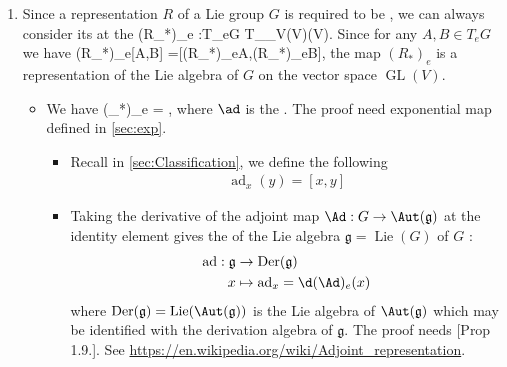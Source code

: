 \documentclass{article}
\newcommand{\GL}{\operatorname{GL}}
\newcommand{\cl}{:\text{ }}
\begin{document}
\begin{enumerate}
\begin{itemize}
\end{itemize}


\item {}
Since a representation $R$ of a Lie group $G$ is required to be , we can always consider its  at the 
\bse
(R_*)_e \cl T_eG \xrightarrow{\sim} T_{\id_V}\!\GL(V)\equiv \GL(V).
\ese
Since for any $A,B\in T_eG$ we have
\bse
(R_*)_e[A,B] =[(R_*)_eA,(R_*)_eB],
\ese
the map $(R_*)_e$ is a representation of the Lie algebra of $G$ on the vector space $\GL(V)$.
\begin{itemize}
    \item {} We have
\bse
(\Ad_*)_e = \ad,
\ese
where $\ad$ is the . The proof need exponential map defined in \cref{sec:exp}.
\begin{itemize}[$\ast$]
    \item {\tiny Recall in \cref{sec:Classification}, we define the following 
    \begin{align*}
\operatorname{ad}_x(y)=[x, y]
\end{align*}}
\item 
Taking the derivative of the adjoint map
$\Ad: G \rightarrow \Aut(\mathfrak{g})$
at the identity element gives the  of the Lie algebra $\mathfrak{g}=\operatorname{Lie}(G)$ of $G$ :
\begin{align*}
\begin{aligned}
\mathrm{ad}: \mathfrak{g} & \rightarrow \operatorname{Der}(\mathfrak{g}) \\
x & \mapsto \operatorname{ad}_x=\d(\Ad)_e(x)
\end{aligned}
\end{align*}
 where $\operatorname{Der}(\mathfrak{g})=\operatorname{Lie}(\Aut(\mathfrak{g}))$ is the Lie algebra of $\Aut(\mathfrak{g})$ {\tiny which may be identified with the derivation algebra of $\mathfrak{g}$. The proof needs \cite{kobayashi1963foundations}[Prop 1.9.]. See \url{https://en.wikipedia.org/wiki/Adjoint_representation}.}
 

\end{itemize}
\end{itemize}
\end{enumerate}
\end{document}
